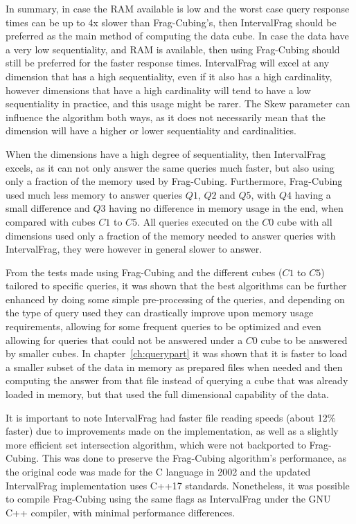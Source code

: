 In summary, in case the RAM available is low and the worst case query response times can be up to 4x slower than Frag-Cubing's, then IntervalFrag should be preferred as the main method of computing the data cube.
In case the data have a very low sequentiality, and RAM is available, then using Frag-Cubing should still be preferred for the faster response times.
IntervalFrag will excel at any dimension that has a high sequentiality, even if it also has a high cardinality, however dimensions that have a high cardinality will tend to have a low sequentiality in practice, and this usage might be rarer.
The Skew parameter can influence the algorithm both ways, as it does not necessarily mean that the dimension will have a higher or lower sequentiality and cardinalities.

When the dimensions have a high degree of sequentiality, then IntervalFrag excels, as it can not only answer the same queries much faster, but also using only a fraction of the memory used by Frag-Cubing.
Furthermore, Frag-Cubing used much less memory to answer queries $Q1$, $Q2$ and $Q5$, with $Q4$ having a small difference and $Q3$ having no difference in memory usage in the end, when compared with cubes $C1$ to $C5$.
All queries executed on the $C0$ cube with all dimensions used only a fraction of the memory needed to answer queries with IntervalFrag, they were however in general slower to answer.

From the tests made using Frag-Cubing and the different cubes ($C1$ to $C5$) tailored to specific queries, it was shown that the best algorithms can be further enhanced by doing some simple pre-processing of the queries, and depending on the type of query used they can drastically improve upon memory usage requirements, allowing for some frequent queries to be optimized and even allowing for queries that could not be answered under a $C0$ cube to be answered by smaller cubes.
In chapter~\ref{ch:querypart} it was shown that it is faster to load a smaller subset of the data in memory as prepared files when needed and then computing the answer from that file instead of querying a cube that was already loaded in memory, but that used the full dimensional capability of the data.


It is important to note IntervalFrag had faster file reading speeds (about 12\% faster) due to improvements made on the implementation, as well as a slightly more efficient set intersection algorithm, which were not backported to Frag-Cubing.
This was done to preserve the Frag-Cubing algorithm's performance, as the original code was made for the C language in 2002 and the updated IntervalFrag implementation uses C++17 standards.
Nonetheless, it was possible to compile Frag-Cubing using the same flags as IntervalFrag under the GNU C++ compiler, with minimal performance differences.

